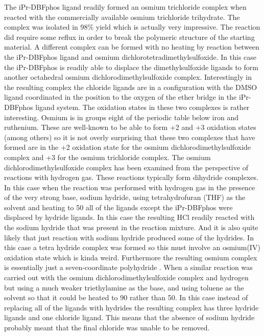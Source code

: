 The iPr-DBFphos ligand readily formed an osmium trichloride complex when reacted with the commercially available osmium trichloride trihydrate.  The complex was isolated in 98\% yield which is actually very impressive.  The reaction did require some reflux in order to  break the polymeric structure of the starting material.  A different complex can be formed with  no heating by reaction between the iPr-DBFphos ligand and osmium dichlorotetradimethylsulfoxide.  In this case the iPr-DBFphos is readily able to displace the dimethylsulfoxide ligands to form another octahedral osmium dichlorodimethylsulfoxide complex.  Interestingly in the resulting complex the chloride ligands are in a \trans{} configuration with the DMSO ligand coordinated in the position \trans{} to the oxygen of the ether bridge in the iPr-DBFphos ligand system.  The oxidation states in these two complexes is rather interesting.  Osmium is in groups eight of the periodic table below iron and ruthenium.  These are well-known to be able to form +2 and +3 oxidation states (among others) so it is not overly surprising that these two complexes that have formed are in the +2 oxidation state for the osmium dichlorodimethylsulfoxide complex and +3 for the osmium trichloride complex.  The osmium dichlorodimethylsulfoxide complex has been examined from the perspective of reactions with hydrogen gas.  These reactions typically form dihydride complexes.  In this case when the reaction was performed with hydrogen gas in the presence of the very strong base, sodium hydride, using tetrahydrofuran (THF) as the solvent and heating to 50\degC{} all of the ligands except the iPr-DBFphos were displaced by hydride ligands.  In this case the resulting HCl readily reacted with the sodium hydride that was present in the reaction mixture.  And it is also quite likely that just reaction with sodium hydride produced some of the hydrides.  In this case a tetra hydride complex was formed so this must involve an osmium(IV) oxidation state which is kinda weird.  Furthermore the resulting osmium complex is essentially just a seven-coordinate polyhydride .  When a similar reaction was carried out with the osmium dichlorodimethylsulfoxide complex and hydrogen but using a much weaker triethylamine as the base, and using toluene as the solvent so that it could be heated to 90\degC{} rather than 50\degC. In this case instead of replacing all of the ligands with hydrides the resulting complex has three hydride ligands and one chloride ligand.  This means that the absence of sodium hydride probably meant that the final chloride was unable to be removed.  

